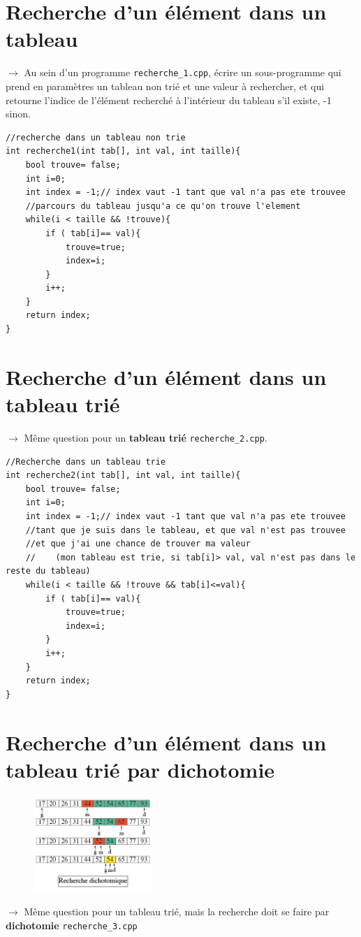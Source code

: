 \documentclass[french]{article}
\begin{document}
\section{Recherche d'un élément dans un tableau}

	$\rightarrow$ Au sein d’un programme \texttt{recherche\_1.cpp}, écrire un sous-programme qui prend en paramètres un tableau non trié et une valeur à rechercher, et qui retourne l’indice de l’élément recherché à l’intérieur du tableau s’il existe, -1 sinon.
	
	\begin{lstlisting}[caption={Recherche dans un tableau non trie}]
//recherche dans un tableau non trie
int recherche1(int tab[], int val, int taille){
    bool trouve= false;
    int i=0;
    int index = -1;// index vaut -1 tant que val n'a pas ete trouvee
    //parcours du tableau jusqu'a ce qu'on trouve l'element
    while(i < taille && !trouve){
        if ( tab[i]== val){
            trouve=true;
            index=i;
        }
        i++;
    }
    return index;
}
	\end{lstlisting}
	
\section{Recherche d'un élément dans un tableau trié}
	$\rightarrow$ Même question pour un \textbf{tableau trié} \texttt{recherche\_2.cpp}.

\begin{lstlisting}[caption={Recherche dans un tableau trie}]
//Recherche dans un tableau trie
int recherche2(int tab[], int val, int taille){
    bool trouve= false;
    int i=0;
    int index = -1;// index vaut -1 tant que val n'a pas ete trouvee
    //tant que je suis dans le tableau, et que val n'est pas trouvee
    //et que j'ai une chance de trouver ma valeur
    //    (mon tableau est trie, si tab[i]> val, val n'est pas dans le reste du tableau)
    while(i < taille && !trouve && tab[i]<=val){
        if ( tab[i]== val){
            trouve=true;
            index=i;
        }
        i++;
    }
    return index;
}
\end{lstlisting}

\section{Recherche d'un élément dans un tableau trié par dichotomie}
	
	\begin{figure}[h]
		\centering
		\includegraphics[width=0.4\textwidth]{dicho.jpg}
	\end{figure}
	$\rightarrow$ Même question pour un tableau trié, mais la recherche doit se faire par \textbf{dichotomie} \texttt{recherche\_3.cpp}
	
\end{document}
